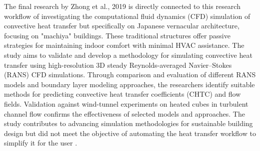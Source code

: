 The final research by Zhong et al., 2019 \cite{litrev2} is directly connected to this research workflow of investigating the computational fluid dynamics (CFD) simulation of convective heat transfer but specifically on Japanese vernacular architecture, focusing on "machiya" buildings. These traditional structures offer passive strategies for maintaining indoor comfort with minimal HVAC assistance. The study aims to validate and develop a methodology for simulating convective heat transfer using high-resolution 3D steady Reynolds-averaged Navier–Stokes (RANS) CFD simulations. Through comparison and evaluation of different RANS models and boundary layer modeling approaches, the researchers identify suitable methods for predicting convective heat transfer coefficients (CHTC) and flow fields. Validation against wind-tunnel experiments on heated cubes in turbulent channel flow confirms the effectiveness of selected models and approaches. The study contributes to advancing simulation methodologies for sustainable building design but did not meet the objective of automating the heat transfer workflow to simplify it for the user \cite{litrev2}. 



